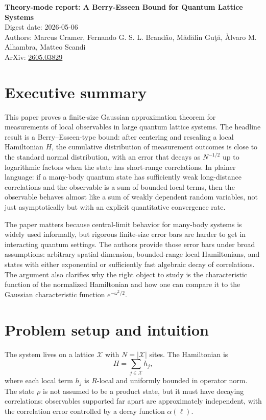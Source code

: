 \documentclass[11pt]{article}
\begin{document}
\begin{center}
{\Large \textbf{Theory-mode report: A Berry-Esseen Bound for Quantum Lattice Systems}}\\[0.4em]
Digest date: 2026-05-06\\
Authors: Marcus Cramer, Fernando G. S. L. Brand\~ao, M\u{a}d\u{a}lin Gu\c{t}\u{a}, \`Alvaro M. Alhambra, Matteo Scandi\\
ArXiv: \href{https://arxiv.org/abs/2605.03829}{2605.03829}
\end{center}

\section*{Executive summary}
This paper proves a finite-size Gaussian approximation theorem for measurements of local observables in large quantum lattice systems. The headline result is a Berry--Esseen-type bound: after centering and rescaling a local Hamiltonian $H$, the cumulative distribution of measurement outcomes is close to the standard normal distribution, with an error that decays as $N^{-1/2}$ up to logarithmic factors when the state has short-range correlations. In plainer language: if a many-body quantum state has sufficiently weak long-distance correlations and the observable is a sum of bounded local terms, then the observable behaves almost like a sum of weakly dependent random variables, not just asymptotically but with an explicit quantitative convergence rate.

The paper matters because central-limit behavior for many-body systems is widely used informally, but rigorous finite-size error bars are harder to get in interacting quantum settings. The authors provide those error bars under broad assumptions: arbitrary spatial dimension, bounded-range local Hamiltonians, and states with either exponential or sufficiently fast algebraic decay of correlations. The argument also clarifies why the right object to study is the characteristic function of the normalized Hamiltonian and how one can compare it to the Gaussian characteristic function $e^{-\omega^2/2}$.

\section*{Problem setup and intuition}
The system lives on a lattice $\mathcal X$ with $N=|\mathcal X|$ sites. The Hamiltonian is
\[
H = \sum_{j\in \mathcal X} h_j,
\]
where each local term $h_j$ is $R$-local and uniformly bounded in operator norm. The state $\rho$ is not assumed to be a product state, but it must have decaying correlations: observables supported far apart are approximately independent, with the correlation error controlled by a decay function $\alpha(\ell)$.
\end{document}

